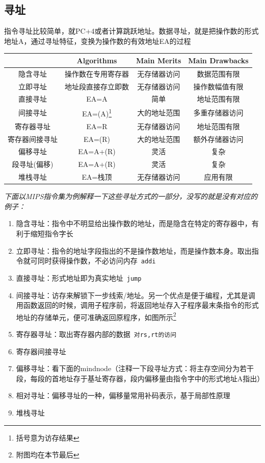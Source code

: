 \documentclass[]{report}
\begin{document}
	\subsection{寻址}
		指令寻址比较简单，就PC+4或者计算跳跃地址。数据寻址，就是把操作数的形式地址A，通过寻址特征，变换为操作数的有效地址EA的过程\par
		\begin{table}[h]
			\centering
			\begin{tabular}{cccc}
				\toprule
				&Algorithms&Main Merits&Main Drawbacks\\
				\midrule
				隐含寻址&操作数在专用寄存器&无存储器访问&数据范围有限\\
				立即寻址&地址段直接存立即数&无存储器访问&操作数幅值有限\\
				直接寻址&EA=A&简单&地址范围有限\\
				间接寻址&EA=(A)\footnote{括号意为访存结果}&大的地址范围&多重存储器访问\\
				寄存器寻址&EA=R&无存储器访问&地址范围有限\\
				寄存器间接寻址&EA=(R)&大的地址范围&额外存储器访问\\
				偏移寻址&EA=A+(R)&灵活&复杂\\
				段寻址(偏移)&EA=A+(R)&灵活&复杂\\
				堆栈寻址&EA=栈顶&无存储器访问&应用有限\\
				\bottomrule
			\end{tabular}
		\end{table}\par
		\textit{下面以MIPS指令集为例解释一下这些寻址方式的一部分，没写的就是没有对应的例子：}\par
		\begin{enumerate}
			\item 隐含寻址：指令中不明显给出操作数的地址，而是隐含在特定的寄存器中，有利于缩短指令字长
			\item 立即寻址：指令的地址字段指出的不是操作数地址，而是操作数本身。取出指令就可同时获得操作数，不必访问内存\ \verb|addi|
			\item 直接寻址：形式地址即为真实地址\ \verb|jump|
			\item 间接寻址：访存来解锁下一步线索/地址。另一个优点是便于编程，尤其是调用函数返回的时候，调用子程序前，将返回地址存入子程序最末条指令的形式地址的存储单元，便可准确返回原程序，如图所示\dag\footnote{附图均在本节最后}
			\item 寄存器寻址：取出寄存器内部的数据\ \verb|对rs,rt的访问|
			\item 寄存器间接寻址
			\item 偏移寻址：看下面的mindnode\ddag （注释一下段寻址方式：将主存空间分为若干段，每段的首地址存于基址寄存器，段内偏移量由指令字中的形式地址A指出）
			\item 相对寻址：偏移寻址的一种，偏移量常用补码表示，基于局部性原理
			\item 堆栈寻址
		\end{enumerate}\par
\end{document}

